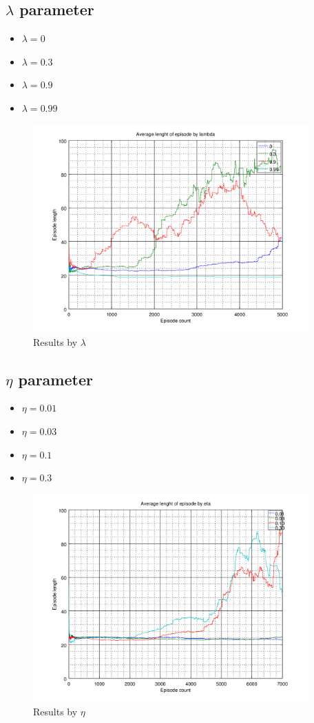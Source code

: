 \documentclass[a4paper,11pt]{article}
\begin{document}
\subsection{$ \lambda $ parameter}


\begin{itemize}
	\item $\lambda = 0 $
	\item $\lambda = 0.3 $
	\item $\lambda = 0.9 $
	\item $\lambda = 0.99 $
\end{itemize}
\begin{figure}
	\label{fig:lambda}
	\includegraphics[width=300pt]{lambda}
	\caption{Results by $\lambda$}
\end{figure}


\subsection{$ \eta $ parameter}

\begin{itemize}
	\item $\eta = 0.01 $
	\item $\eta = 0.03 $
	\item $\eta = 0.1 $
	\item $\eta = 0.3 $
\end{itemize}
\begin{figure}
	\label{fig:eta}
	\includegraphics[width=300pt]{eta}
	\caption{Results by $\eta$}
\end{figure}
\end{document}
